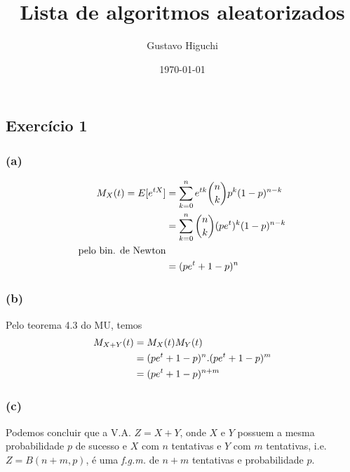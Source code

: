 \documentclass{article}
\title{Lista de algoritmos aleatorizados}
\author{Gustavo Higuchi}
\date{\today}
\begin{document}
\maketitle

\tableofcontents
\newpage


\chapter{}
\section{Exercício 1}
\subsection*{(a)}
\begin{equation}
\notag
	\begin{split}
		M_X(t) = E[e^{tX}] &= \sum\limits_{k=0}^n e^{tk} {n \choose k} p^k(1-p)^{n-k}\\
		&= \sum\limits_{k=0}^n{n \choose k}(pe^t)^k (1-p)^{n-k}\\
		\text{pelo bin. de Newton}&\\
		&= (pe^t + 1-p)^n
	\end{split}
\end{equation}

\subsection*{(b)}
Pelo teorema 4.3 do MU, temos
\begin{equation}
\notag
	\begin{split}
		M_{X+Y}(t) &= M_X(t)M_Y(t)\\
		&= (pe^t + 1-p)^n . (pe^t + 1-p)^m\\
		&= (pe^t + 1-p)^{n+m}
	\end{split}
\end{equation}

\subsection*{(c)}
Podemos concluir que a V.A. $Z = X + Y$, onde $X$ e $Y$ possuem a mesma probabilidade $p$ de 
sucesso e $X$ com $n$ tentativas e $Y$ com $m$ tentativas, i.e. $Z = B(n+m, p)$, é uma \emph{f.g.m.} de $n+m$ tentativas e probabilidade $p$.
\end{document}
